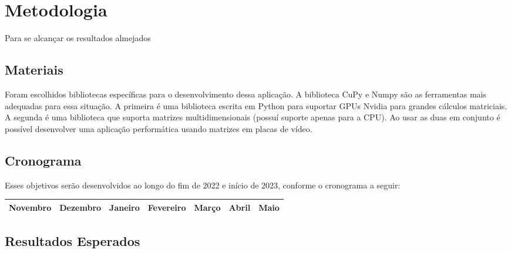\section{Metodologia}

Para se alcançar os resultados almejados 

\subsection{Materiais}

Foram escolhidos bibliotecas específicas para o desenvolvimento dessa aplicação.
A biblioteca CuPy\cite{cupyLib} e Numpy\cite{numpyLib} são as ferramentas mais adequadas
para essa situação. A primeira é uma biblioteca escrita em Python para suportar GPUs Nvidia
para grandes cálculos matriciais. A segunda é uma biblioteca que suporta matrizes multidimensionais
(possuí suporte apenas para a CPU). Ao usar as duas em conjunto é possível desenvolver uma aplicação
performática usando matrizes em placas de vídeo.

\subsection{Cronograma}

Esses objetivos serão desenvolvidos ao longo do fim de 2022 e início de 2023, conforme o 
cronograma a seguir:

\begin{center}
    \begin{tabular}{|c|c|c|c|c|c|c|}
        \hline
        Novembro & Dezembro & Janeiro & Fevereiro & Março & Abril & Maio \\
        \hline
    \end{tabular}
\end{center}

\subsection{Resultados Esperados}
